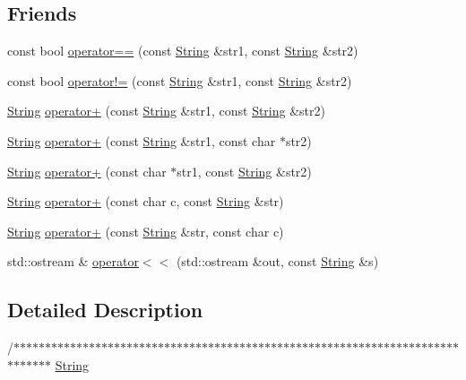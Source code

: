 \subsection*{Friends}
\begin{DoxyCompactItemize}
\item 
const bool \hyperlink{classprism_1_1_string_a42ce36244ff044035bee8e0e1d764aa1}{operator==} (const \hyperlink{classprism_1_1_string}{String} \&str1, const \hyperlink{classprism_1_1_string}{String} \&str2)
\item 
const bool \hyperlink{classprism_1_1_string_a5ae2214b74e00980046a6b8bc25c5e7b}{operator!=} (const \hyperlink{classprism_1_1_string}{String} \&str1, const \hyperlink{classprism_1_1_string}{String} \&str2)
\item 
\hyperlink{classprism_1_1_string}{String} \hyperlink{classprism_1_1_string_a3ea798e6b83ba7c64271b5124e5120fc}{operator+} (const \hyperlink{classprism_1_1_string}{String} \&str1, const \hyperlink{classprism_1_1_string}{String} \&str2)
\item 
\hyperlink{classprism_1_1_string}{String} \hyperlink{classprism_1_1_string_a89cb74b26f923798ee7f796af2a1ae42}{operator+} (const \hyperlink{classprism_1_1_string}{String} \&str1, const char $\ast$str2)
\item 
\hyperlink{classprism_1_1_string}{String} \hyperlink{classprism_1_1_string_ab79aff2a74a10fab48972bc689e5d87d}{operator+} (const char $\ast$str1, const \hyperlink{classprism_1_1_string}{String} \&str2)
\item 
\hyperlink{classprism_1_1_string}{String} \hyperlink{classprism_1_1_string_a9df3169a19201b969014c154ef4b87a1}{operator+} (const char c, const \hyperlink{classprism_1_1_string}{String} \&str)
\item 
\hyperlink{classprism_1_1_string}{String} \hyperlink{classprism_1_1_string_a990ec91916a269128a8d9ad66b0224a9}{operator+} (const \hyperlink{classprism_1_1_string}{String} \&str, const char c)
\item 
std\+::ostream \& \hyperlink{classprism_1_1_string_a22f0a77d546199afaac3503fc9b9ef51}{operator$<$$<$} (std\+::ostream \&out, const \hyperlink{classprism_1_1_string}{String} \&s)
\end{DoxyCompactItemize}


\subsection{Detailed Description}
/$\ast$$\ast$$\ast$$\ast$$\ast$$\ast$$\ast$$\ast$$\ast$$\ast$$\ast$$\ast$$\ast$$\ast$$\ast$$\ast$$\ast$$\ast$$\ast$$\ast$$\ast$$\ast$$\ast$$\ast$$\ast$$\ast$$\ast$$\ast$$\ast$$\ast$$\ast$$\ast$$\ast$$\ast$$\ast$$\ast$$\ast$$\ast$$\ast$$\ast$$\ast$$\ast$$\ast$$\ast$$\ast$$\ast$$\ast$$\ast$$\ast$$\ast$$\ast$$\ast$$\ast$$\ast$$\ast$$\ast$$\ast$$\ast$$\ast$$\ast$$\ast$$\ast$$\ast$$\ast$$\ast$$\ast$$\ast$$\ast$$\ast$$\ast$$\ast$$\ast$$\ast$$\ast$$\ast$$\ast$$\ast$$\ast$ \hyperlink{classprism_1_1_string}{String}

